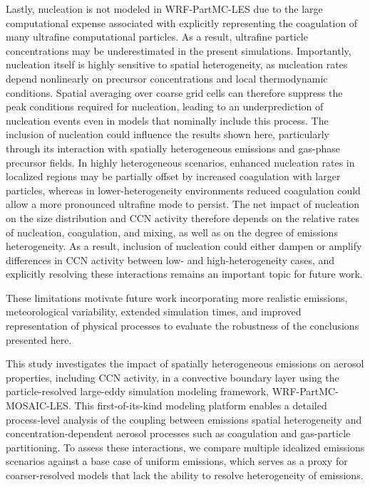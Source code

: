 \documentclass[acp, manuscript]{copernicus}
\begin{document}
Lastly, nucleation is not modeled in WRF-PartMC-LES due to the large computational expense associated with explicitly representing the coagulation of many ultrafine computational particles. As a result, ultrafine particle concentrations may be
  underestimated in the present simulations. Importantly, nucleation
  itself is highly sensitive to spatial heterogeneity, as nucleation
  rates depend nonlinearly on precursor concentrations and local
  thermodynamic conditions. Spatial averaging over coarse grid cells
  can therefore suppress the peak conditions required for nucleation,
  leading to an underprediction of nucleation events even in models
  that nominally include this process. The inclusion of nucleation
  could influence the results shown here, particularly through its
  interaction with spatially heterogeneous emissions and gas-phase
  precursor fields. In highly heterogeneous scenarios, enhanced
  nucleation rates in localized regions may be partially offset by
  increased coagulation with larger particles, whereas in
  lower-heterogeneity environments reduced coagulation could allow a
  more pronounced ultrafine mode to persist. The net impact of
  nucleation on the size distribution and CCN activity therefore
  depends on the relative rates of nucleation, coagulation, and
  mixing, as well as on the degree of emissions heterogeneity. As a
  result, inclusion of nucleation could either dampen or amplify
  differences in CCN activity between low- and high-heterogeneity
  cases, and explicitly resolving these interactions remains an
  important topic for future work.
  
These limitations motivate future work incorporating more realistic
emissions, meteorological variability, extended simulation times, and improved representation of physical processes to evaluate the robustness of the conclusions presented here.


\conclusions  %

This study investigates the impact of spatially heterogeneous
emissions on aerosol properties, including CCN activity, in a
convective boundary layer using the particle-resolved large-eddy
simulation modeling framework, WRF-PartMC-MOSAIC-LES. This
first-of-its-kind modeling platform enables a detailed process-level
analysis of the coupling between emissions spatial heterogeneity and
concentration-dependent aerosol processes such as coagulation and
gas-particle partitioning. To assess these interactions, we compare
multiple idealized emissions scenarios against a base case of uniform
emissions, which serves as a proxy for coarser-resolved models that
lack the ability to resolve heterogeneity of emissions.
\end{document}
